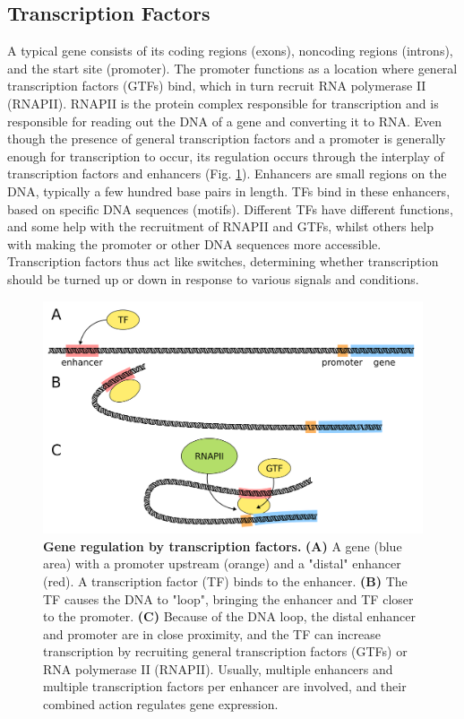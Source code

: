\subsection{Transcription Factors}

A typical gene consists of its coding regions (exons), noncoding regions (introns), and the start site (promoter). The promoter functions as a location where general transcription factors (GTFs) bind, which in turn recruit RNA polymerase II (RNAPII). RNAPII is the protein complex responsible for transcription and is responsible for reading out the DNA of a gene and converting it to RNA. Even though the presence of general transcription factors and a promoter is generally enough for transcription to occur\cite{Haberle2018}, its regulation occurs through the interplay of transcription factors and enhancers (Fig.  \ref{fig:TF}). Enhancers are small regions on the DNA, typically a few hundred base pairs in length. TFs bind in these enhancers, based on specific DNA sequences (motifs). Different TFs have different functions, and some help with the recruitment of RNAPII and GTFs, whilst others help with making the promoter or other DNA sequences more accessible. Transcription factors thus act like switches, determining whether transcription should be turned up or down in response to various signals and conditions.

\begin{figure}[h]
    \center
    \includegraphics[width=0.8\linewidth]{ch.introduction/imgs/transcription_factor.png}
    \caption{\textbf{Gene regulation by transcription factors.} \textbf{(A)} A gene (blue area) with a promoter upstream (orange) and a "distal" enhancer (red). A transcription factor (TF) binds to the enhancer. \textbf{(B)} The TF causes the DNA to "loop", bringing the enhancer and TF closer to the promoter. \textbf{(C)} Because of the DNA loop, the distal enhancer and promoter are in close proximity, and the TF can increase transcription by recruiting general transcription factors (GTFs) or RNA polymerase II (RNAPII). Usually, multiple enhancers and multiple transcription factors per enhancer are involved, and their combined action regulates gene expression.}
    \label{fig:TF}
\end{figure}

